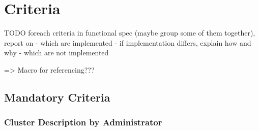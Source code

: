 \section{Criteria}

TODO foreach criteria in functional spec (maybe group some of them together), report on
	- which are implemented
		- if implementation differs, explain how and why
	- which are not implemented

=> Macro for referencing???
\subsection{Mandatory Criteria}
\subsubsection{Cluster Description by Administrator}
